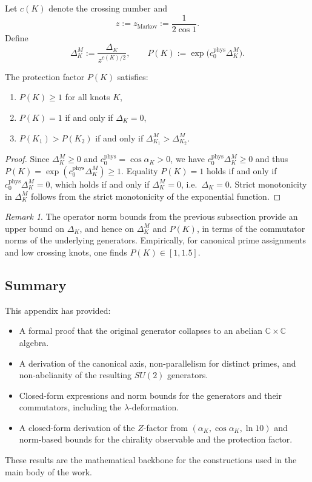 \documentclass[11pt]{article}
\theoremstyle{remark}
\newtheorem{remark}[theorem]{Remark}
\begin{document}
Let $c(K)$ denote the crossing number and
\[
  z := z_{\mathrm{Markov}} := \frac{1}{2\cos 1}.
\]
Define
\[
  \Delta_K^M := \frac{\Delta_K}{z^{c(K)/2}},
  \qquad
  P(K) := \exp\bigl(c_0^{\mathrm{phys}}\Delta_K^M\bigr).
\]

\begin{proposition}
The protection factor $P(K)$ satisfies:
\begin{enumerate}[label=(\roman*),leftmargin=*]
  \item $P(K)\ge1$ for all knots $K$,
  \item $P(K)=1$ if and only if $\Delta_K=0$,
  \item $P(K_1)>P(K_2)$ if and only if $\Delta_{K_1}^M>\Delta_{K_2}^M$.
\end{enumerate}
\end{proposition}

\begin{proof}
Since $\Delta_K^M\ge0$ and $c_0^{\mathrm{phys}}=\cos\alpha_K>0$, we have
$c_0^{\mathrm{phys}}\Delta_K^M\ge0$ and thus
$P(K)=\exp(c_0^{\mathrm{phys}}\Delta_K^M)\ge 1$. Equality $P(K)=1$ holds if
and only if $c_0^{\mathrm{phys}}\Delta_K^M=0$, which holds if and only if
$\Delta_K^M=0$, i.e.\ $\Delta_K=0$. Strict monotonicity in $\Delta_K^M$
follows from the strict monotonicity of the exponential function.
\end{proof}

\begin{remark}
The operator norm bounds from the previous subsection provide an upper bound
on $\Delta_K$, and hence on $\Delta_K^M$ and $P(K)$, in terms of the
commutator norms of the underlying generators. Empirically, for canonical
prime assignments and low crossing knots, one finds $P(K)\in[1,1.5]$.
\end{remark}

\subsection{Summary}

This appendix has provided:

\begin{itemize}[leftmargin=*]
  \item A formal proof that the original generator collapses to an abelian
        $\mathbb{C}\times\mathbb{C}$ algebra.
  \item A derivation of the canonical axis, non-parallelism for distinct
        primes, and non-abelianity of the resulting $SU(2)$ generators.
  \item Closed-form expressions and norm bounds for the generators and their
        commutators, including the $\lambda$-deformation.
  \item A closed-form derivation of the $Z$-factor from
        $(\alpha_K,\cos\alpha_K,\ln 10)$ and norm-based bounds for the
        chirality observable and the protection factor.
\end{itemize}

These results are the mathematical backbone for the constructions used in
the main body of the work.

\nocite{*}
  

\end{document}
